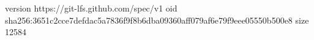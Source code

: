 version https://git-lfs.github.com/spec/v1
oid sha256:3651c2cce7defdac5a7836f9f8b6dba09360aff079af6e79f9eee05550b500e8
size 12584
